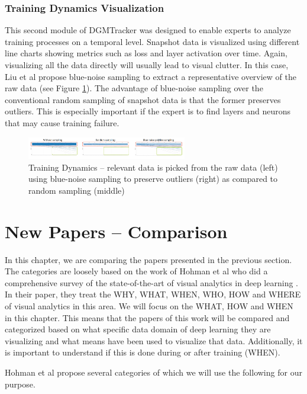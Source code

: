 \documentclass{acmsiggraph}               %
\begin{document}
\subsubsection{Training Dynamics Visualization}
This second module of DGMTracker was designed to enable experts to analyze training processes on a temporal level.
Snapshot data is visualized using different line charts showing metrics such as loss and layer activation over time. Again, visualizing all the data directly will usually lead to visual clutter. In this case, Liu et al propose blue-noise sampling to extract a representative overview of the raw data (see Figure \ref{fig:mengchen4}). The advantage of blue-noise sampling over the conventional random sampling of snapshot data is that the former preserves outliers. This is especially important if the expert is to find layers and neurons that may cause training failure.

\begin{figure}[!htb]
  \centering
  \includegraphics[width=2.75in]{mengchen4}
  \caption{Training Dynamics -- relevant data is picked from the raw data (left) using blue-noise sampling to preserve outliers (right) as compared to random sampling (middle) \protect\cite{Liu2018}}
  \label{fig:mengchen4}
\end{figure}

\section{New Papers -- Comparison}
In this chapter, we are comparing the papers presented in the previous section. 
The categories are loosely based on the work of Hohman et al who did a comprehensive survey of the state-of-the-art of visual analytics in deep learning \cite{Hohman2018}.
In their paper, they treat the WHY, WHAT, WHEN, WHO, HOW and WHERE of visual analytics in this area.
We will focus on the WHAT, HOW and WHEN in this chapter. This means that the papers of this work will be compared and categorized based on what specific data domain of deep learning they are visualizing and what means have been used to visualize that data. Additionally, it is important to understand if this is done during or after training (WHEN).

Hohman et al propose several categories of which we will use the following for our purpose.
\end{document}
